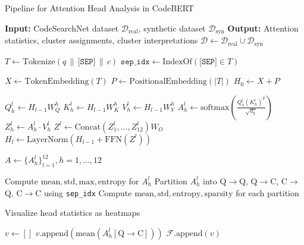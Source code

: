 \documentclass[conference]{IEEEtran}
\begin{document}
\begin{algorithm}[htbp]
\caption{Pipeline for Attention Head Analysis in CodeBERT}
\label{alg:attention-analysis} 
\begin{algorithmic}
\State \textbf{Input:} CodeSearchNet dataset $\mathcal{D}_{\text{real}}$, synthetic dataset $\mathcal{D}_{\text{syn}}$
\State \textbf{Output:} Attention statistics, cluster assignments, cluster interpretations
    \State $\mathcal{D} \gets \mathcal{D}_{\text{real}} \cup \mathcal{D}_{\text{syn}}$ 
    
        \State $T \gets \text{Tokenize}(q \,\|\, \texttt{[SEP]} \,\|\, c)$
        \State $\texttt{sep\_idx} \gets \text{IndexOf}(\texttt{[SEP]} \in T)$
        
        \State $X \gets \text{TokenEmbedding}(T)$
        \State $P \gets \text{PositionalEmbedding}(|T|)$
        \State $H_0 \gets X + P$ 

         
             
                \State $Q_h^l \gets H_{l-1} W_Q^h$
                \State $K_h^l \gets H_{l-1} W_K^h$
                \State $V_h^l \gets H_{l-1} W_V^h$
                \State $A_h^l \gets \text{softmax} \left( \frac{Q_h^l (K_h^l)^T}{\sqrt{d_k}} \right)$
                \State $Z_h^l \gets A_h^l \cdot V_h^l$
            \EndFor
            \State $Z^l \gets \text{Concat}(Z_1^l, \dots, Z_{12}^l) W_O$
            \State $H_l \gets \text{LayerNorm}(H_{l-1} + \text{FFN}(Z^l))$
        \EndFor
        
        \State $A \gets \{A_h^l\}_{l=1}^{12}, h=1,\dots,12$ 
        
            \State Compute $\text{mean}, \text{std}, \text{max}, \text{entropy}$ for $A_h^l$
            \State Partition $A_h^l$ into Q$\rightarrow$Q, Q$\rightarrow$C, C$\rightarrow$Q, C$\rightarrow$C using \texttt{sep\_idx}
            \State Compute $\text{mean}, \text{std}, \text{entropy}, \text{sparsity}$ for each partition
        \EndFor
    \EndFor

    \State Visualize head statistics as heatmaps

        \State $v \gets []$
            \State $v.\text{append}(\text{mean}(A_h^l[\text{Q} \rightarrow \text{C}]))$
        \EndFor
        \State $\mathcal{F}.\text{append}(v)$ 
    \EndFor


\end{algorithmic}
\end{algorithm}
\end{document}
